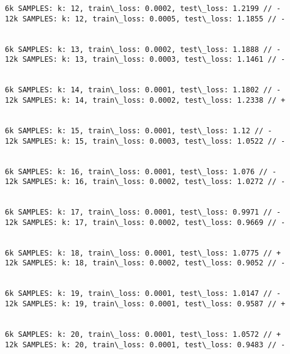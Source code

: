 \documentclass[11pt]{article}
\begin{document}
\begin{Verbatim}[commandchars=\\\{\}]
6k SAMPLES: k: 12, train\_loss: 0.0002, test\_loss: 1.2199 // -
12k SAMPLES: k: 12, train\_loss: 0.0005, test\_loss: 1.1855 // -


6k SAMPLES: k: 13, train\_loss: 0.0002, test\_loss: 1.1888 // -
12k SAMPLES: k: 13, train\_loss: 0.0003, test\_loss: 1.1461 // -


6k SAMPLES: k: 14, train\_loss: 0.0001, test\_loss: 1.1802 // -
12k SAMPLES: k: 14, train\_loss: 0.0002, test\_loss: 1.2338 // +


6k SAMPLES: k: 15, train\_loss: 0.0001, test\_loss: 1.12 // -
12k SAMPLES: k: 15, train\_loss: 0.0003, test\_loss: 1.0522 // -


6k SAMPLES: k: 16, train\_loss: 0.0001, test\_loss: 1.076 // -
12k SAMPLES: k: 16, train\_loss: 0.0002, test\_loss: 1.0272 // -


6k SAMPLES: k: 17, train\_loss: 0.0001, test\_loss: 0.9971 // -
12k SAMPLES: k: 17, train\_loss: 0.0002, test\_loss: 0.9669 // -


6k SAMPLES: k: 18, train\_loss: 0.0001, test\_loss: 1.0775 // +
12k SAMPLES: k: 18, train\_loss: 0.0002, test\_loss: 0.9052 // -


6k SAMPLES: k: 19, train\_loss: 0.0001, test\_loss: 1.0147 // -
12k SAMPLES: k: 19, train\_loss: 0.0001, test\_loss: 0.9587 // +


6k SAMPLES: k: 20, train\_loss: 0.0001, test\_loss: 1.0572 // +
12k SAMPLES: k: 20, train\_loss: 0.0001, test\_loss: 0.9483 // -



    \end{Verbatim}
\end{document}
